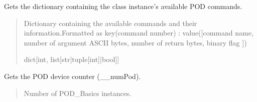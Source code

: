 \documentclass[letterpaper,10pt,english]{sphinxmanual}
\begin{document}
\begin{fulllineitems}
\begin{fulllineitems}
\begin{quote}
\begin{description}
\end{description}\end{quote}

\end{fulllineitems}


\begin{fulllineitems}
\label{\detokenize{BasicPodProtocol:BasicPodProtocol.POD_Basics.GetDeviceCommands}}
\pysigstartsignatures
{}
\pysigstopsignatures
\sphinxAtStartPar
Gets the dictionary containing the class instance’s available POD commands.
\begin{quote}\begin{description}
\sphinxAtStartPar
Dictionary containing the available commands and their                 information.Formatted as key(command number) : value({[}command name, number of argument                 ASCII bytes, number of return bytes, binary flag {]})

\sphinxAtStartPar
dict{[}int, list{[}str|tuple{[}int{]}|bool{]}{]}

\end{description}\end{quote}

\end{fulllineitems}


\begin{fulllineitems}
\label{\detokenize{BasicPodProtocol:BasicPodProtocol.POD_Basics.GetNumberOfPODDevices}}
\pysigstartsignatures
{}
\pysigstopsignatures
\sphinxAtStartPar
Gets the POD device counter (\_\_numPod).
\begin{quote}\begin{description}
\sphinxAtStartPar
Number of POD\_Basics instances.


\end{description}
\end{quote}
\end{fulllineitems}
\end{fulllineitems}
\end{document}
